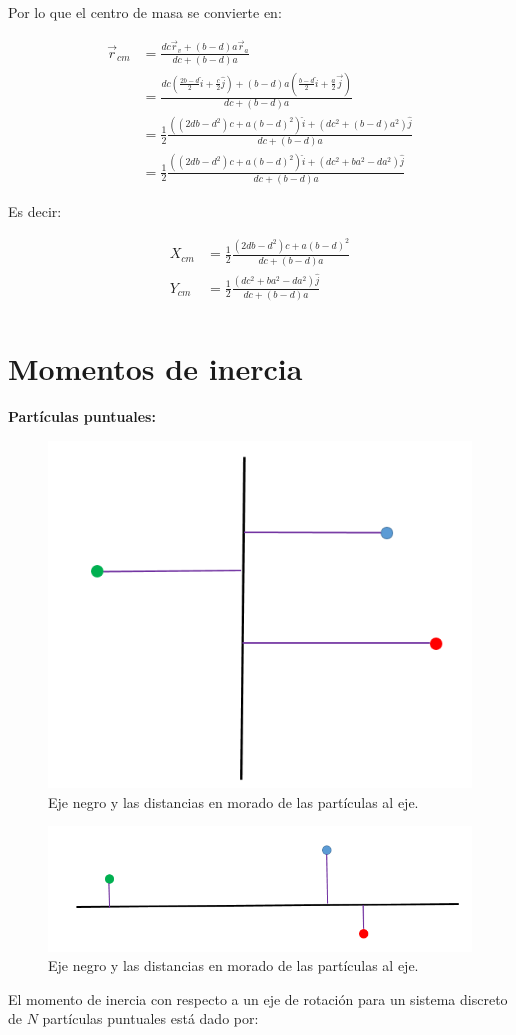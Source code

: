 \documentclass[a4paper,11pt]{article}
\theoremstyle{mytheor}
\begin{document}
Por lo que el centro de masa se convierte en:

\begin{align*}
\vec{r}_{cm}  &= \frac{  dc \vec{r}_v+  (b-d)a \vec{r}_a}{ dc + (b-d)a}\\
&= \frac{  dc ( \frac{2b-d}{2}\hat{i} + \frac{c}{2}\hat{j})+  (b-d)a (\frac{b-d}{2} \hat{i} + \frac{a}{2} \vec{j})}{ dc + (b-d)a}\\
& =\frac{1}{2} \frac{  ((2db-d^2)c +a(b-d)^2) \hat{i} + (dc^2+(b-d)a^2)\hat{j}}{ dc + (b-d)a}\\
& = \frac{1}{2} \frac{   ((2db-d^2)c +a(b-d)^2) \hat{i} + (dc^2+ba^2-da^2)\hat{j}}{ dc + (b-d)a}
\end{align*}

Es decir:


\begin{align*}
X_{cm}  &= \frac{1}{2} \frac{   (2db-d^2)c +a(b-d)^2 }{ dc + (b-d)a}\\
Y_{cm}&= \frac{1}{2} \frac{   (dc^2+ba^2-da^2)\hat{j}}{ dc + (b-d)a}\\
\end{align*}

\section{Momentos de inercia}


\textbf{Partículas puntuales:}


\begin{figure}[h]
	\includegraphics[width=0.4\linewidth]{rot1}
	\caption{Eje negro y las distancias en morado de las partículas al eje.}
	\label{fcN4}
\end{figure}


\begin{figure}[h]
	\includegraphics[width=0.5\linewidth]{rot2}
	\caption{Eje negro y las distancias en morado de las partículas al eje.}
	\label{fcN4}
\end{figure}
El momento de inercia con respecto a un eje de rotación para un sistema discreto de $N$ partículas puntuales  está dado por:
\end{document}
